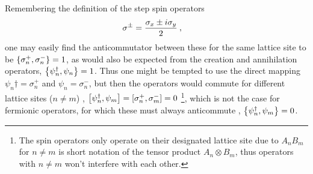 \documentclass[../main.tex]{subfiles} %
\begin{document}
Remembering the definition of the step spin operators \cite{sakurai_modernQM_2017}
\begin{align} \index{sigmaplus@$\sigma^+$}\index{sigmaminus@$\sigma^-$}
    \sigma^\pm &= \frac{\sigma_x \pm i \sigma_y}{2} \: ,
\end{align}
one may easily find the anticommutator between these for the same lattice site to be $\anticommutator{\sigma_n^+}{\sigma_n^-} = 1$, as would also be expected from the creation and annihilation operators, $\anticommutator{\psi_n\dagger}{\psi_n} = 1$. Thus one might be tempted to use the direct mapping $\psi_n\dagger = \sigma_n^+$ and $\psi_n = \sigma_n^-$, but then the operators would commute for different lattice sites ($n \ne m$) \cite{susskind_latticeFermions_1977}, $\commutator{\psi_n\dagger}{\psi_m} = \commutator{\sigma_n^+}{\sigma_m^-} = 0$ \footnote{The spin operators only operate on their designated lattice site due to $A_n B_m$ for $n \ne m$ is short notation of the tensor product $A_n \otimes B_m$, thus operators with $n \ne m$ won't interfere with each other.}, which is not the case for fermionic operators, for which these must always anticommute \cite{sakurai_modernQM_2017}, $\anticommutator{\psi_n\dagger}{\psi_m} = 0$.
\end{document}
